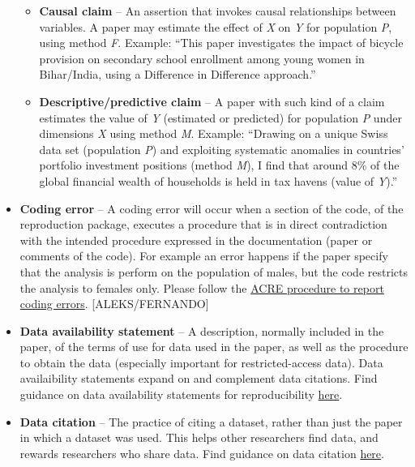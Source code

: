 \documentclass[]{book}
\providecommand{\tightlist}{%
  \setlength{\itemsep}{0pt}\setlength{\parskip}{0pt}}
\begin{document}
\begin{itemize}
  \begin{itemize}
  \tightlist
  \item
    \textbf{Causal claim} -- An assertion that invokes causal relationships between variables. A paper may estimate the effect of \emph{X} on \emph{Y} for population \emph{P}, using method \emph{F}. Example: ``This paper investigates the impact of bicycle provision on secondary school enrollment among young women in Bihar/India, using a Difference in Difference approach.''\\
  \item
    \textbf{Descriptive/predictive claim} -- A paper with such kind of a claim estimates the value of \emph{Y} (estimated or predicted) for population \emph{P} under dimensions \emph{X} using method \emph{M}. Example: ``Drawing on a unique Swiss data set (population \emph{P}) and exploiting systematic anomalies in countries' portfolio investment positions (method \emph{M}), I find that around 8\% of the global financial wealth of households is held in tax havens (value of \emph{Y}).''\\
  \end{itemize}
\item
  \textbf{Coding error} -- A coding error will occur when a section of the code, of the reproduction package, executes a procedure that is in direct contradiction with the intended procedure expressed in the documentation (paper or comments of the code). For example an error happens if the paper specify that the analysis is perform on the population of males, but the code restricts the analysis to females only. Please follow the \href{ADD\%20LINK}{ACRE procedure to report coding errors}. {[}ALEKS/FERNANDO{]}
\item
  \textbf{Data availability statement} -- A description, normally included in the paper, of the terms of use for data used in the paper, as well as the procedure to obtain the data (especially important for restricted-access data). Data availaibility statements expand on and complement data citations. Find guidance on data availability statements for reproducibility \href{https://social-science-data-editors.github.io/guidance/Requested_information_dcas.html\#what-are-data-and-code-availability-statements-dcas}{here}.\\
\item
  \textbf{Data citation} -- The practice of citing a dataset, rather than just the paper in which a dataset was used. This helps other researchers find data, and rewards researchers who share data. Find guidance on data citation \href{https://social-science-data-editors.github.io/guidance/Data_citation_guidance.html}{here}.\\

\end{itemize}
\end{document}
